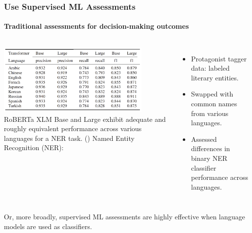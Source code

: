 \documentclass[11pt,
               aspectratio=169,
               hyperref={colorlinks}
               ]{beamer}
\begin{document}
		\begin{frame}
			
			\frametitle{Use Supervised ML Assessments}
			\framesubtitle{Traditional assessments for decision-making outcomes}
			
			\begin{columns}
				\centering
				\newline  \newline  \newline
				\includegraphics[height=100pt]{../img/Superv_ML.png} 
				\newline
				\tiny{RoBERTa XLM Base and Large exhibit adequate and roughly equivalent performance across various languages for a NER task. (\cite{iqtlabs})}
				\vspace{-5pt}
				Named Entity Recognition (NER):\\
				\begin{itemize}
					\item Protagonist tagger data: labeled literary entities.
					\item Swapped with common names from various languages.
					\item Assessed differences in binary NER classifier performance across languages.
				\end{itemize}
			\end{columns}
			\vspace{10pt}
			\small{Or, more broadly, supervised ML assessments are highly effective when language models are used as classifiers.}
					
		\end{frame}
		
			
			
\end{document}
